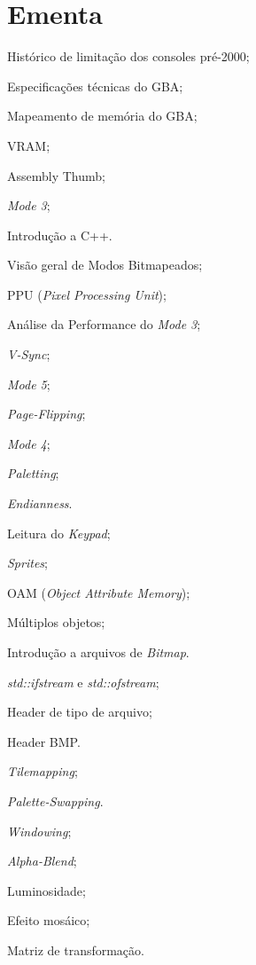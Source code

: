 \documentclass{article}
\begin{document}
\section{Ementa}
\begin{itemize*}[label={}]
    \item[] Histórico de limitação dos consoles pré-2000;
    \item[] Especificações técnicas do GBA;
    \item[] Mapeamento de memória do GBA;
    \item[] VRAM;
    \item[] Assembly Thumb;
    \item[] \textit{Mode 3};
    \item[] Introdução a C++.
    \item[] Visão geral de Modos Bitmapeados;
    \item[] PPU (\textit{Pixel Processing Unit});
    \item[] Análise da Performance do \textit{Mode 3};
    \item[] \textit{V-Sync};
    \item[] \textit{Mode 5};
    \item[] \textit{Page-Flipping};
    \item[] \textit{Mode 4};
    \item[] \textit{Paletting};
    \item[] \textit{Endianness}.
    \item[] Leitura do \textit{Keypad};
    \item[] \textit{Sprites};
    \item[] OAM (\textit{Object Attribute Memory});
    \item[] Múltiplos objetos;
    \item[] Introdução a arquivos de \textit{Bitmap}.
    \item[] \textit{std::ifstream} e \textit{std::ofstream};
    \item[] Header de tipo de arquivo;
    \item[] Header BMP.
    \item[] \textit{Tilemapping};
    \item[] \textit{Palette-Swapping}.
    \item[] \textit{Windowing};
    \item[] \textit{Alpha-Blend};
    \item[] Luminosidade;
    \item[] Efeito mosáico;
    \item[] Matriz de transformação.

\end{itemize*}
\end{document}
